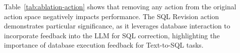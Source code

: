 Table~\ref{tab:ablation-action} shows that removing any action from the original action space negatively impacts performance. The SQL Revision action demonstrates particular significance, as it leverages database interaction to incorporate feedback into the LLM for SQL correction, highlighting the importance of database execution feedback for Text-to-SQL tasks.







%




































